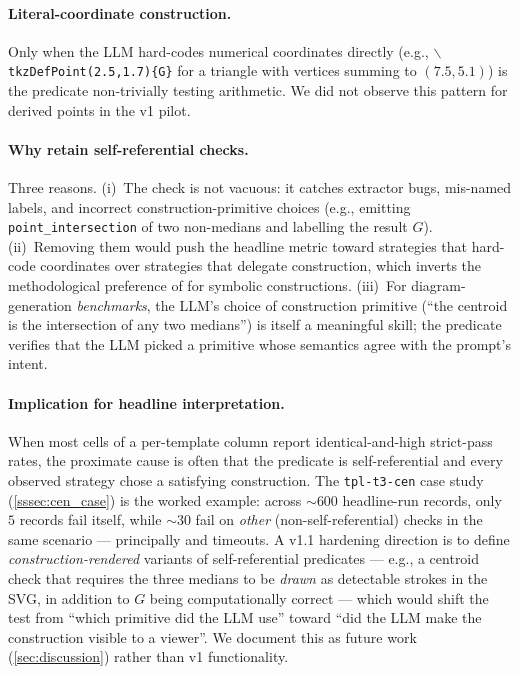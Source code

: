 \paragraph{Literal-coordinate construction.} Only when the LLM hard-codes numerical coordinates directly (e.g., $\backslash$\texttt{tkzDefPoint(2.5,1.7)\{G\}} for a triangle with vertices summing to $(7.5, 5.1)$) is the predicate non-trivially testing arithmetic.
We did not observe this pattern for derived points in the v1 pilot.

\paragraph{Why retain self-referential checks.}
Three reasons.
(i)~The check is not vacuous: it catches extractor bugs, mis-named labels, and incorrect construction-primitive choices (e.g., emitting \texttt{point\_intersection} of two non-medians and labelling the result $G$).
(ii)~Removing them would push the headline metric toward strategies that hard-code coordinates over strategies that delegate construction, which inverts the methodological preference of \GeoGen for symbolic constructions.
(iii)~For diagram-generation \emph{benchmarks}, the LLM's choice of construction primitive (``the centroid is the intersection of any two medians'') is itself a meaningful skill; the predicate verifies that the LLM picked a primitive whose semantics agree with the prompt's intent.

\paragraph{Implication for headline interpretation.}
When most cells of a per-template column report identical-and-high strict-pass rates, the proximate cause is often that the predicate is self-referential and every observed strategy chose a satisfying construction.
The \texttt{tpl-t3-cen} case study (\cref{sssec:cen_case}) is the worked example: across $\sim 600$ headline-run records, only $5$ records fail  itself, while $\sim 30$ fail on \emph{other} (non-self-referential) checks in the same scenario --- principally  and timeouts.
A v1.1 hardening direction is to define \emph{construction-rendered} variants of self-referential predicates --- e.g., a centroid check that requires the three medians to be \emph{drawn} as detectable strokes in the SVG, in addition to $G$ being computationally correct --- which would shift the test from ``which primitive did the LLM use'' toward ``did the LLM make the construction visible to a viewer''.
We document this as future work (\cref{sec:discussion}) rather than v1 functionality.

